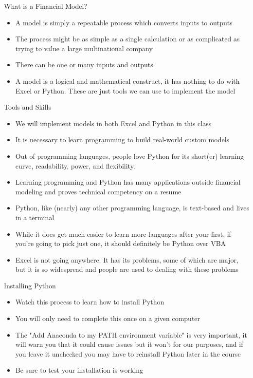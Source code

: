 \documentclass[]{article}
\begin{document}
\begin{section}{What is a Financial Model?}
\begin{itemize}
\item A model is simply a repeatable process which converts inputs to outputs
\item The process might be as simple as a single calculation or as complicated as trying to value a large multinational company
\item There can be one or many inputs and outputs
\item A model is a logical and mathematical construct, it has nothing to do with Excel or Python. These are just tools we can use to implement the model
\end{itemize}
\end{section}
\begin{section}{Tools and Skills}
\begin{itemize}
\item We will implement models in both Excel and Python in this class
\item It is necessary to learn programming to build real-world custom models
\item Out of programming languages, people love Python for its short(er) learning curve, readability, power, and flexibility. 
\item Learning programming and Python has many applications outside financial modeling and proves technical competency on a resume
\item Python, like (nearly) any other programming language, is text-based and lives in a terminal
\item While it does get much easier to learn more languages after your first, if you're going to pick just one, it should definitely be Python over VBA
\item Excel is not going anywhere. It has its problems, some of which are major, but it is so widespread and people are used to dealing with these problems
\end{itemize}
\end{section}
\begin{section}{Installing Python}
\begin{itemize}
\item Watch this process to learn how to install Python
\item You will only need to complete this once on a given computer
\item The "Add Anaconda to my PATH environment variable" is very important, it will warn you that it could cause issues but it won't for our purposes, and if you leave it unchecked you may have to reinstall Python later in the course
\item Be sure to test your installation is working
\end{itemize}
\end{section}
\end{document}
